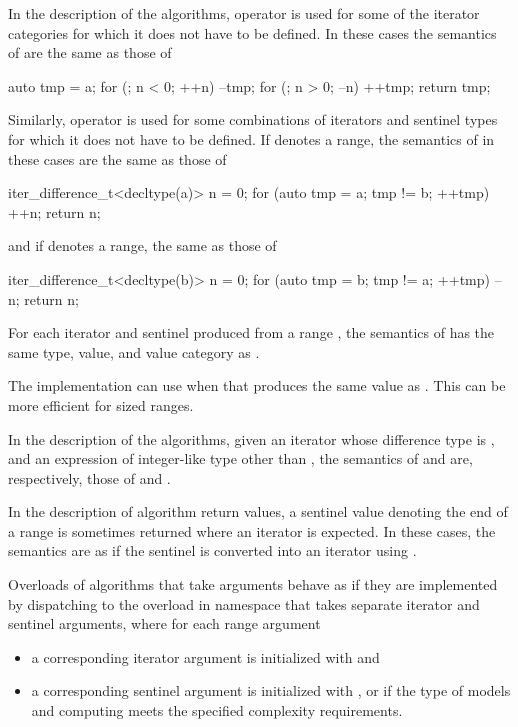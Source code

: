 \pnum
In the description of the algorithms, operator \tcode{+}
is used for some of the iterator categories
for which it does not have to be defined.
In these cases the semantics of  are the same as those of
\begin{codeblock}
auto tmp = a;
for (; n < 0; ++n) --tmp;
for (; n > 0; --n) ++tmp;
return tmp;
\end{codeblock}
Similarly, operator \tcode{-} is used
for some combinations of iterators and sentinel types
for which it does not have to be defined.
If  denotes a range,
the semantics of  in these cases are the same as those of
\begin{codeblock}
iter_difference_t<decltype(a)> n = 0;
for (auto tmp = a; tmp != b; ++tmp) ++n;
return n;
\end{codeblock}
and if  denotes a range, the same as those of
\begin{codeblock}
iter_difference_t<decltype(b)> n = 0;
for (auto tmp = b; tmp != a; ++tmp) --n;
return n;
\end{codeblock}
For each iterator  and sentinel 
produced from a range ,
the semantics of  has the same type, value, and value category
as .
\begin{note}
The implementation can use 
when that produces the same value as .
This can be more efficient for sized ranges.
\end{note}

\pnum
In the description of the algorithms,
given an iterator  whose difference type is , and
an expression  of integer-like type other than \cv{} ,
the semantics of  and  are, respectively,
those of  and .

\pnum
In the description of algorithm return values,
a sentinel value  denoting the end of a range 
is sometimes returned where an iterator is expected.
In these cases,
the semantics are as if the sentinel is converted into an iterator using
.

\pnum
Overloads of algorithms that take  arguments
behave as if they are implemented by
dispatching to the overload in namespace 
that takes separate iterator and sentinel arguments,
where for each range argument 
\begin{itemize}
\item
  a corresponding iterator argument is initialized with  and
\item
  a corresponding sentinel argument is initialized with ,
  or 
  if the type of  models 
  and computing  meets the specified complexity requirements.
\end{itemize}

